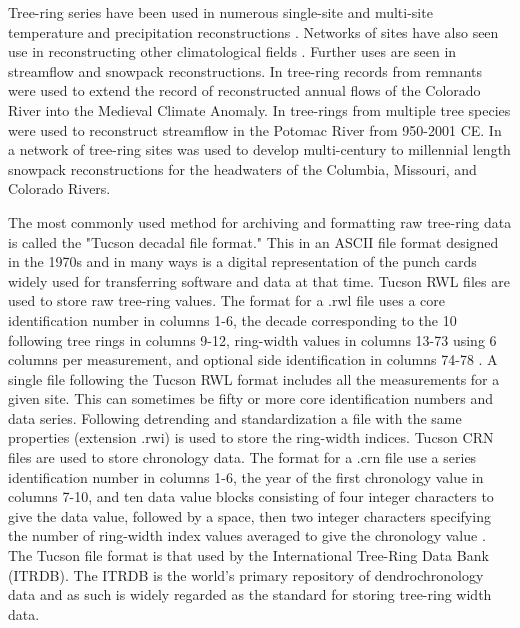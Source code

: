 \documentclass[phd,tocprelim]{cornell}
\begin{document}
\par
Tree-ring series have been used in numerous single-site and multi-site 
temperature and precipitation reconstructions 
\cite{salzer2005,shao2005,graumlich1987,hughes1984}. Networks of sites have 
also seen use in reconstructing other climatological fields 
\cite{seftigen2015,shi2012}. Further uses are seen in streamflow and 
snowpack reconstructions. In \cite{meko2007medieval} tree-ring records 
from remnants were used to extend the record of reconstructed annual 
flows of the Colorado River into the Medieval Climate Anomaly. 
In \cite{maxwell2011multispecies} tree-rings from multiple tree 
species were used to reconstruct streamflow in the Potomac River 
from 950-2001 CE. In \cite{pederson2011unusual} a network of tree-ring 
sites was used to develop multi-century to millennial length snowpack 
reconstructions for the headwaters of the Columbia, Missouri, and 
Colorado Rivers. 

\par
The most commonly used method for archiving and formatting raw tree-ring 
data is called the "Tucson decadal file format." This in an ASCII 
file format designed in the 1970s and in many ways is a digital 
representation of the punch cards widely used for transferring 
software and data at that time. Tucson RWL files are used to store 
raw tree-ring values. The format for a .rwl file uses a core identification 
number in columns 1-6, the decade corresponding to the 10 following tree 
rings in columns 9-12, ring-width values in columns 13-73 using 6 columns 
per measurement, and optional side identification in columns 74-78 
\cite{brewer2014data,grissino1997,brewer2011}. A single file 
following the Tucson RWL format includes all the measurements for a 
given site. This can sometimes be fifty or more core identification 
numbers and data series. Following detrending and standardization a 
file with the same properties (extension .rwi) is used to store the 
ring-width indices. Tucson CRN files are used to store chronology data. 
The format for a .crn file use a series identification number in columns 
1-6, the year of the first chronology value in columns 7-10, and ten data 
value blocks consisting of four integer characters to give the data 
value, followed by a space, then two integer characters specifying the 
number of ring-width index values averaged to give the chronology 
value \cite{brewer2011}. The Tucson file format is that used by the 
International Tree-Ring Data Bank (ITRDB). The ITRDB is the world's primary 
repository of dendrochronology data and as such is widely regarded 
as the standard for storing tree-ring width data. 
\end{document}
